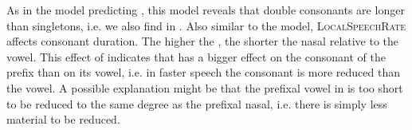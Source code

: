 \begin{table}
	\caption{ Summary of linear model for variables predicting the Box-Cox-transformed relative duration of [m]  in prefixed words}
	\label{tbl: summary model rel du in corpus}
	
	


\end{table}


As in the model predicting , this model reveals that double consonants are longer than singletons, i.e. we also find  in . Also similar to the  model, \textsc{LocalSpeechRate} affects consonant duration. The higher the , the shorter the nasal relative to the vowel. This effect of  indicates that  has a bigger effect on the consonant of the prefix  than on its vowel, i.e. in faster speech the consonant is more reduced than the vowel. A possible explanation might be that the prefixal vowel in  is too short to be reduced to the same degree as the prefixal nasal, i.e. there is simply less material to be reduced.

